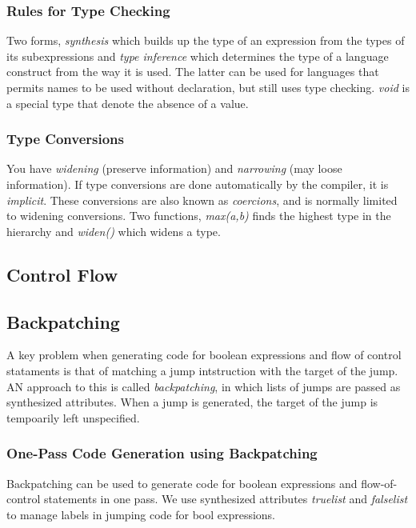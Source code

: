 \documentclass{article}
\begin{document}
\subsubsection{Rules for Type Checking} %
\label{ssub:Rules for Type Checking}
Two forms, \emph{synthesis} which builds up the type of an expression from the types of its subexpressions and \emph{type inference} which determines the type of a language construct from the way it is used. The latter can be used for languages that permits names to be used without declaration, but still uses type checking. \emph{void} is a special type that denote the absence of a value.
\subsubsection{Type Conversions} %
\label{ssub:Type Conversions}
You have \emph{widening} (preserve information) and \emph{narrowing} (may loose information). If type conversions are done automatically by the compiler, it is \emph{implicit}. These conversions are also known as \emph{coercions}, and is normally limited to widening conversions. Two functions, \emph{max(a,b)} finds the highest type in the hierarchy and \emph{widen()} which widens a type.


\subsection{Control Flow} %
\label{sub:Control Flow}


\subsection{Backpatching} %
\label{sub:Backpatching}
A key problem when generating code for boolean expressions and flow of control stataments is that of matching a jump intstruction with the target of the jump. AN approach to this is called \emph{backpatching}, in which lists of jumps are passed as synthesized attributes. When a jump is generated, the target of the jump is tempoarily left unspecified.

\subsubsection{One-Pass Code Generation using Backpatching} %
\label{ssub:One-Pass Code Generation using Backpatching}
Backpatching can be used to generate code for boolean expressions and flow-of-control statements in one pass. We use synthesized attributes \emph{truelist} and \emph{falselist} to manage labels in jumping code for bool expressions.
\end{document}
